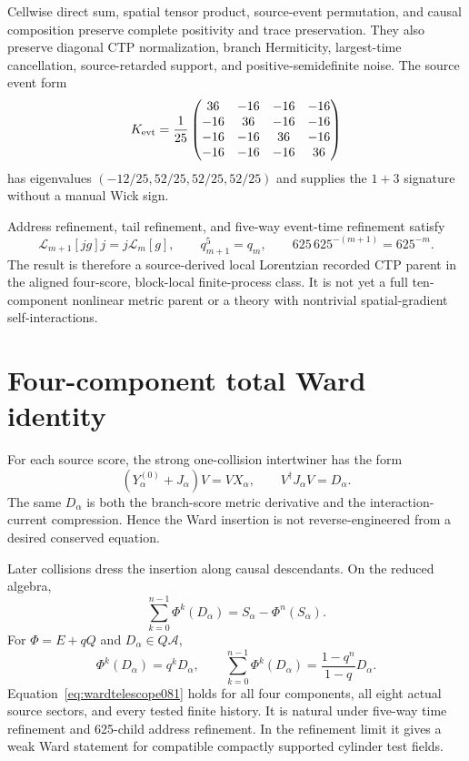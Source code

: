 \documentclass[11pt]{article}
\theoremstyle{definition}
\theoremstyle{remark}
\begin{document}
Cellwise direct sum, spatial tensor product, source-event permutation, and causal composition preserve complete positivity and trace preservation. They also preserve diagonal CTP normalization, branch Hermiticity, largest-time cancellation, source-retarded support, and positive-semidefinite noise. The source event form
\begin{equation}
 K_{\rm evt}=\frac1{25}
 \begin{pmatrix}
 36&-16&-16&-16\\
 -16&36&-16&-16\\
 -16&-16&36&-16\\
 -16&-16&-16&36
 \end{pmatrix}
\end{equation}
has eigenvalues $(-12/25,52/25,52/25,52/25)$ and supplies the $1+3$ signature without a manual Wick sign.

Address refinement, tail refinement, and five-way event-time refinement satisfy
\begin{equation}
 \mathcal L_{m+1}[jg]j=j\mathcal L_m[g],
 \qquad q_{m+1}^{5}=q_m,
 \qquad 625\,625^{-(m+1)}=625^{-m}.
\end{equation}
The result is therefore a source-derived local Lorentzian recorded CTP parent in the aligned four-score, block-local finite-process class. It is not yet a full ten-component nonlinear metric parent or a theory with nontrivial spatial-gradient self-interactions.

\section{Four-component total Ward identity}\label{sec:finiteward081}

For each source score, the strong one-collision intertwiner has the form
\begin{equation}\label{eq:strongward081}
 (Y^{(0)}_\alpha+J_\alpha)V=VX_\alpha,
 \qquad V^\dagger J_\alpha V=D_\alpha.
\end{equation}
The same $D_\alpha$ is both the branch-score metric derivative and the interaction-current compression. Hence the Ward insertion is not reverse-engineered from a desired conserved equation.

Later collisions dress the insertion along causal descendants. On the reduced algebra,
\begin{equation}\label{eq:wardtelescope081}
 \sum_{k=0}^{n-1}\Phi^k(D_\alpha)
 =S_\alpha-\Phi^n(S_\alpha).
\end{equation}
For $\Phi=E+qQ$ and $D_\alpha\in Q\mathcal A$,
\begin{equation}
 \Phi^k(D_\alpha)=q^kD_\alpha,
 \qquad
 \sum_{k=0}^{n-1}\Phi^k(D_\alpha)
 =\frac{1-q^n}{1-q}D_\alpha.
\end{equation}
Equation~\eqref{eq:wardtelescope081} holds for all four components, all eight actual source sectors, and every tested finite history. It is natural under five-way time refinement and 625-child address refinement. In the refinement limit it gives a weak Ward statement for compatible compactly supported cylinder test fields.
\end{document}
